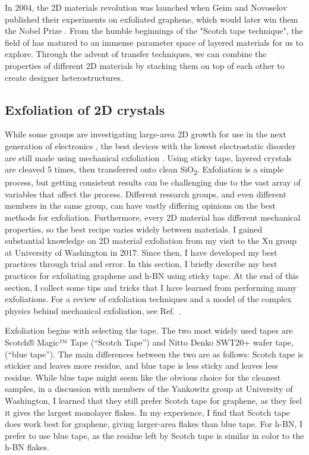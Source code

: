\documentclass{beavtex_dub_edit}
\begin{document}
In 2004, the 2D materials revolution was launched when Geim and Novoselov published their experiments on exfoliated graphene, which would later win them the Nobel Prize \cite{novoselov_electric_2004}. From the humble beginnings of the "Scotch tape technique", the field of has matured to an immense parameter space of layered materials for us to explore. Through the advent of transfer techniques, we can combine the properties of different 2D materials by stacking them on top of each other to create designer heterostructures.

\subsection{Exfoliation of 2D crystals}

While some groups are investigating large-area 2D growth for use in the next generation of electronics \cite{quellmalz_large-area_2021}, the best devices with the lowest electrostatic disorder are still made using mechanical exfoliation \cite{xin_giant_2023}. Using sticky tape, layered crystals are cleaved 5 times, then transferred onto clean SiO\textsubscript{2}. Exfoliation is a simple process, but getting consistent results can be challenging due to the vast array of variables that affect the process. Different research groups, and even different members in the same group, can have vastly differing opinions on the best methods for exfoliation. Furthermore, every 2D material has different mechanical properties, so the best recipe varies widely between materials. I gained substantial knowledge on 2D material exfoliation from my visit to the Xu group at University of Washington in 2017. Since then, I have developed my best practices through trial and error. In this section, I briefly describe my best practices for exfoliating graphene and h-BN using sticky tape. At the end of this section, I collect some tips and tricks that I have learned from performing many exfoliations. For a review of exfoliation techniques and a model of the complex physics behind mechanical exfoliation, see Ref.\ \cite{islam_exfoliation_2022}.

Exfoliation begins with selecting the tape. The two most widely used tapes are Scotch® Magic™ Tape (“Scotch Tape”) and Nitto Denko SWT20+ wafer tape, (“blue tape”). The main differences between the two are as follows: Scotch tape is stickier and leaves more residue, and blue tape is less sticky and leaves less residue. While blue tape might seem like the obvious choice for the cleanest samples, in a discussion with members of the Yankowitz group at University of Washington, I learned that they still prefer Scotch tape for graphene, as they feel it gives the largest monolayer flakes. In my experience, I find that Scotch tape does work best for graphene, giving larger-area flakes than blue tape. For h-BN, I prefer to use blue tape, as the residue left by Scotch tape is similar in color to the h-BN flakes.
\end{document}
